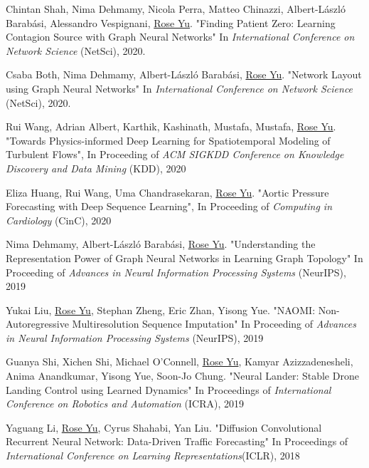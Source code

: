 \documentclass[margin,line]{res}
\begin{document}
\begin{resume}
\begin{enumerate}[label={[C\arabic*]}]
\item Chintan Shah, Nima Dehmamy, Nicola Perra, Matteo Chinazzi, Albert-László Barabási, Alessandro Vespignani, \underline{Rose Yu}.
"Finding Patient Zero: Learning Contagion Source with Graph Neural Networks"
 In \textit{International Conference on Network Science} (NetSci),  2020. 
     
 \item Csaba Both, Nima Dehmamy,  Albert-László Barabási, \underline{Rose Yu}.
"Network Layout using Graph Neural Networks"
 In \textit{International Conference on Network Science} (NetSci),  2020.  

\item Rui Wang, Adrian Albert,  Karthik, Kashinath, Mustafa, Mustafa,  \underline{Rose Yu}. "Towards Physics-informed Deep Learning for Spatiotemporal Modeling of Turbulent Flows", In  Proceeding of\textit{ ACM SIGKDD Conference on Knowledge Discovery and Data Mining} (KDD), 2020

\item Eliza Huang, Rui Wang, Uma Chandrasekaran, \underline{Rose Yu}.  "Aortic Pressure Forecasting with Deep Sequence Learning", In  Proceeding of  \textit{Computing in Cardiology} (CinC), 2020 

\item Nima Dehmamy, Albert-L\'aszl\'o Barab\'asi, \underline{Rose Yu}.  "Understanding the Representation Power of Graph Neural Networks in Learning Graph Topology" In Proceeding of  \textit{Advances in Neural Information Processing Systems} (NeurIPS), 2019
 
 
\item  Yukai Liu, \underline{Rose Yu}, Stephan Zheng, Eric Zhan, Yisong Yue. "NAOMI: Non-Autoregressive Multiresolution Sequence Imputation" In  Proceeding of  \textit{Advances in Neural Information Processing Systems} (NeurIPS), 2019


\item Guanya Shi, Xichen Shi, Michael O'Connell, \underline{Rose Yu}, Kamyar Azizzadenesheli, Anima Anandkumar, Yisong Yue, Soon-Jo Chung. "Neural Lander: Stable Drone Landing Control using Learned Dynamics" In  Proceedings  of \textit{ International Conference on Robotics and Automation} (ICRA), 2019

\item 	Yaguang Li,  \underline{Rose Yu}, Cyrus Shahabi, Yan Liu. "Diffusion Convolutional Recurrent Neural Network: Data-Driven Traffic Forecasting" In  Proceedings  of   \textit{International Conference on Learning Representations}(ICLR), 2018 
	

\end{enumerate}
\end{resume}
\end{document}
